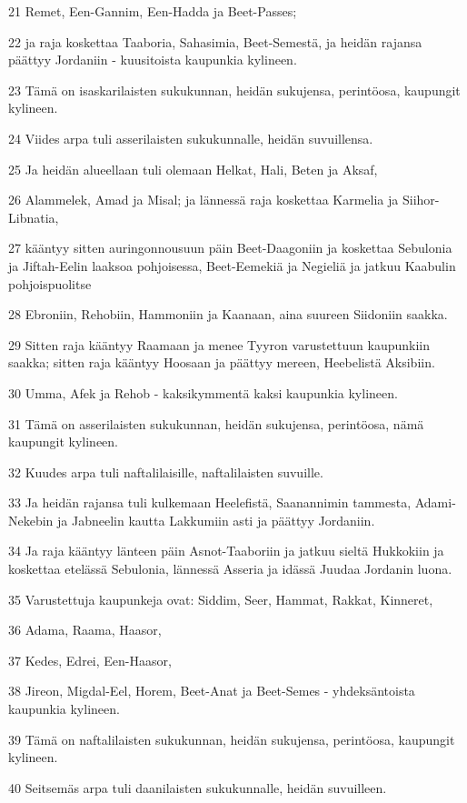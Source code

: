 \par 21 Remet, Een-Gannim, Een-Hadda ja Beet-Passes;
\par 22 ja raja koskettaa Taaboria, Sahasimia, Beet-Semestä, ja heidän rajansa päättyy Jordaniin - kuusitoista kaupunkia kylineen.
\par 23 Tämä on isaskarilaisten sukukunnan, heidän sukujensa, perintöosa, kaupungit kylineen.
\par 24 Viides arpa tuli asserilaisten sukukunnalle, heidän suvuillensa.
\par 25 Ja heidän alueellaan tuli olemaan Helkat, Hali, Beten ja Aksaf,
\par 26 Alammelek, Amad ja Misal; ja lännessä raja koskettaa Karmelia ja Siihor-Libnatia,
\par 27 kääntyy sitten auringonnousuun päin Beet-Daagoniin ja koskettaa Sebulonia ja Jiftah-Eelin laaksoa pohjoisessa, Beet-Eemekiä ja Negieliä ja jatkuu Kaabulin pohjoispuolitse
\par 28 Ebroniin, Rehobiin, Hammoniin ja Kaanaan, aina suureen Siidoniin saakka.
\par 29 Sitten raja kääntyy Raamaan ja menee Tyyron varustettuun kaupunkiin saakka; sitten raja kääntyy Hoosaan ja päättyy mereen, Heebelistä Aksibiin.
\par 30 Umma, Afek ja Rehob - kaksikymmentä kaksi kaupunkia kylineen.
\par 31 Tämä on asserilaisten sukukunnan, heidän sukujensa, perintöosa, nämä kaupungit kylineen.
\par 32 Kuudes arpa tuli naftalilaisille, naftalilaisten suvuille.
\par 33 Ja heidän rajansa tuli kulkemaan Heelefistä, Saanannimin tammesta, Adami-Nekebin ja Jabneelin kautta Lakkumiin asti ja päättyy Jordaniin.
\par 34 Ja raja kääntyy länteen päin Asnot-Taaboriin ja jatkuu sieltä Hukkokiin ja koskettaa etelässä Sebulonia, lännessä Asseria ja idässä Juudaa Jordanin luona.
\par 35 Varustettuja kaupunkeja ovat: Siddim, Seer, Hammat, Rakkat, Kinneret,
\par 36 Adama, Raama, Haasor,
\par 37 Kedes, Edrei, Een-Haasor,
\par 38 Jireon, Migdal-Eel, Horem, Beet-Anat ja Beet-Semes - yhdeksäntoista kaupunkia kylineen.
\par 39 Tämä on naftalilaisten sukukunnan, heidän sukujensa, perintöosa, kaupungit kylineen.
\par 40 Seitsemäs arpa tuli daanilaisten sukukunnalle, heidän suvuilleen.
